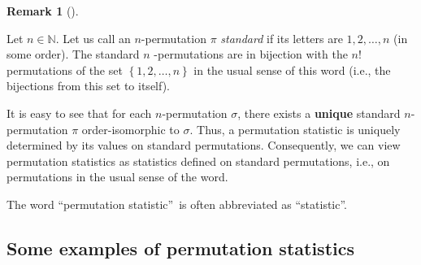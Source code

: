 \documentclass[numbers=enddot,12pt,final,onecolumn,notitlepage]{scrartcl}%
\theoremstyle{definition}
\newtheorem{remk}[theo]{Remark}
\newenvironment{remark}[1][]
{\begin{remk}[#1]\begin{leftbar}}
{\end{leftbar}\end{remk}}
\begin{document}
\begin{remark}
Let $n\in\mathbb{N}$. Let us call an $n$-permutation $\pi$ \textit{standard}
if its letters are $1,2,\ldots,n$ (in some order). The standard $n$%
-permutations are in bijection with the $n!$ permutations of the set $\left\{
1,2,\ldots,n\right\}  $ in the usual sense of this word (i.e., the bijections
from this set to itself).

It is easy to see that for each $n$-permutation $\sigma$, there exists a
\textbf{unique} standard $n$-permutation $\pi$ order-isomorphic to $\sigma$.
Thus, a permutation statistic is uniquely determined by its values on standard
permutations. Consequently, we can view permutation statistics as statistics
defined on standard permutations, i.e., on permutations in the usual sense of
the word.
\end{remark}

The word \textquotedblleft permutation statistic\textquotedblright\ is often
abbreviated as \textquotedblleft statistic\textquotedblright.

\subsection{Some examples of permutation statistics}
\end{document}
